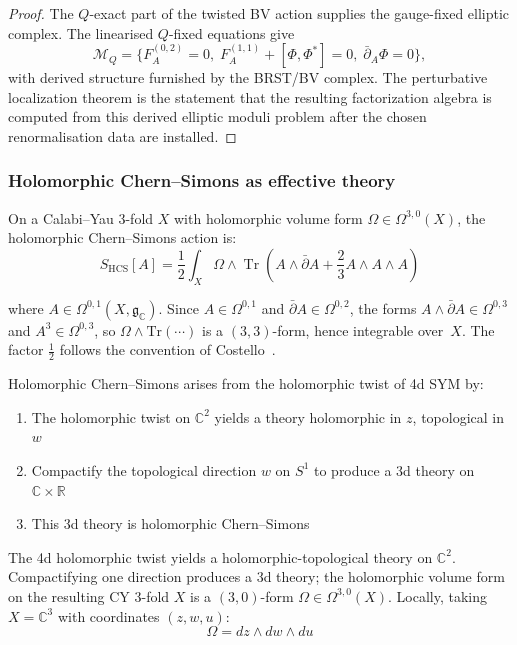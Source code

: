 \begin{proof}
The \(Q\)-exact part of the twisted BV action supplies the gauge-fixed
elliptic complex.  The linearised \(Q\)-fixed equations give
\[
\mathcal{M}_Q =
\{F_{A}^{(0,2)} = 0,\;
F_A^{(1,1)} + [\Phi, \Phi^*] = 0,\;
\bar{\partial}_A \Phi = 0\},
\]
with derived structure furnished by the BRST/BV complex.  The
perturbative localization theorem is the statement that the resulting
factorization algebra is computed from this derived elliptic moduli
problem after the chosen renormalisation data are installed.
\end{proof}

\subsubsection{Holomorphic Chern--Simons as effective theory}

\begin{definition}
On a Calabi--Yau 3-fold $X$ with holomorphic volume form $\Omega \in \Omega^{3,0}(X)$, the
holomorphic Chern--Simons action is:
\[S_{\text{HCS}}[A] = \frac{1}{2}\int_{X} \Omega \wedge \operatorname{Tr}\left(A
\wedge \bar{\partial} A + \frac{2}{3} A \wedge A \wedge A\right)\]

where $A \in \Omega^{0,1}(X, \mathfrak{g}_{\mathbb{C}})$. Since $A \in \Omega^{0,1}$ and $\bar\partial A \in \Omega^{0,2}$, the forms $A \wedge \bar\partial A \in \Omega^{0,3}$ and $A^3 \in \Omega^{0,3}$, so $\Omega \wedge \text{Tr}(\cdots)$ is a $(3,3)$-form, hence integrable over~$X$. The factor $\frac{1}{2}$ follows the convention of Costello~\cite{costello-renormalization}.
\end{definition}

\begin{theorem}\label{thm:hcs-dimensional-reduction}
Holomorphic Chern--Simons \cite{costello-renormalization} arises from the holomorphic twist of 4d SYM by:
\begin{enumerate}
\item The holomorphic twist on $\mathbb{C}^2$ yields a theory holomorphic in $z$, topological in~$w$
\item Compactify the topological direction $w$ on $S^1$ to produce a 3d theory on $\mathbb{C} \times \mathbb{R}$
\item This 3d theory is holomorphic Chern--Simons
\end{enumerate}

The 4d holomorphic twist yields a holomorphic-topological theory on $\mathbb{C}^2$. Compactifying one direction produces a 3d theory; the holomorphic volume form on the resulting CY 3-fold $X$ is a $(3,0)$-form $\Omega \in \Omega^{3,0}(X)$. Locally, taking $X = \mathbb{C}^3$ with coordinates $(z, w, u)$:
\[\Omega = dz \wedge dw \wedge du\]
\end{theorem}


